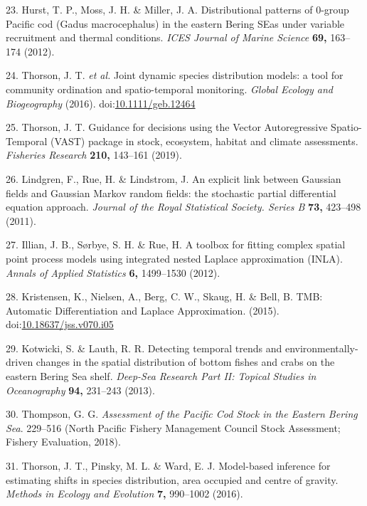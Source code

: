 \documentclass[11pt,]{article}
\begin{document}
\leavevmode\hypertarget{ref-Hurst2012}{}%
23. Hurst, T. P., Moss, J. H. \& Miller, J. A. Distributional patterns of 0-group Pacific cod (Gadus macrocephalus) in the eastern Bering SEas under variable recruitment and thermal conditions. \emph{ICES Journal of Marine Science} \textbf{69,} 163--174 (2012).

\leavevmode\hypertarget{ref-Thorson2016}{}%
24. Thorson, J. T. \emph{et al.} Joint dynamic species distribution models: a tool for community ordination and spatio-temporal monitoring. \emph{Global Ecology and Biogeography} (2016). doi:\href{https://doi.org/10.1111/geb.12464}{10.1111/geb.12464}

\leavevmode\hypertarget{ref-Thorson2019}{}%
25. Thorson, J. T. Guidance for decisions using the Vector Autoregressive Spatio-Temporal (VAST) package in stock, ecosystem, habitat and climate assessments. \emph{Fisheries Research} \textbf{210,} 143--161 (2019).

\leavevmode\hypertarget{ref-Lindgren2011}{}%
26. Lindgren, F., Rue, H. \& Lindstrom, J. An explicit link between Gaussian fields and Gaussian Markov random fields: the stochastic partial differential equation approach. \emph{Journal of the Royal Statistical Society. Series B} \textbf{73,} 423--498 (2011).

\leavevmode\hypertarget{ref-Illian2012}{}%
27. Illian, J. B., Sørbye, S. H. \& Rue, H. A toolbox for fitting complex spatial point process models using integrated nested Laplace approximation (INLA). \emph{Annals of Applied Statistics} \textbf{6,} 1499--1530 (2012).

\leavevmode\hypertarget{ref-Kristensen2015}{}%
28. Kristensen, K., Nielsen, A., Berg, C. W., Skaug, H. \& Bell, B. TMB: Automatic Differentiation and Laplace Approximation. (2015). doi:\href{https://doi.org/10.18637/jss.v070.i05}{10.18637/jss.v070.i05}

\leavevmode\hypertarget{ref-Kotwicki2013}{}%
29. Kotwicki, S. \& Lauth, R. R. Detecting temporal trends and environmentally-driven changes in the spatial distribution of bottom fishes and crabs on the eastern Bering Sea shelf. \emph{Deep-Sea Research Part II: Topical Studies in Oceanography} \textbf{94,} 231--243 (2013).

\leavevmode\hypertarget{ref-Thompson2018}{}%
30. Thompson, G. G. \emph{Assessment of the Pacific Cod Stock in the Eastern Bering Sea}. 229--516 (North Pacific Fishery Management Council Stock Assessment; Fishery Evaluation, 2018).

\leavevmode\hypertarget{ref-Thorson2016a}{}%
31. Thorson, J. T., Pinsky, M. L. \& Ward, E. J. Model-based inference for estimating shifts in species distribution, area occupied and centre of gravity. \emph{Methods in Ecology and Evolution} \textbf{7,} 990--1002 (2016).
\end{document}
